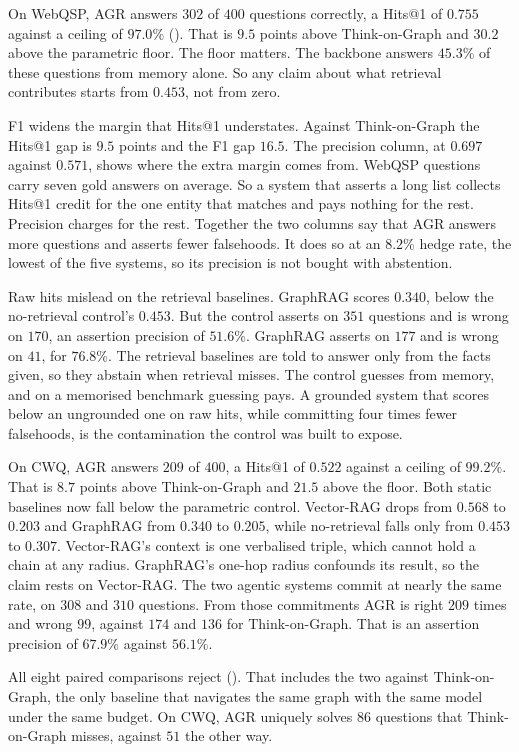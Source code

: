 On WebQSP, AGR answers $302$ of $400$ questions correctly, a Hits@1 of $0.755$
against a ceiling of $97.0\%$ (). That is $9.5$ points above
Think-on-Graph and $30.2$ above the parametric floor. The floor matters. The
backbone answers $45.3\%$ of these questions from memory alone. So any claim
about what retrieval contributes starts from $0.453$, not from zero.

F1 widens the margin that Hits@1 understates. Against Think-on-Graph the Hits@1
gap is $9.5$ points and the F1 gap $16.5$. The precision column, at $0.697$
against $0.571$, shows where the extra margin comes from. WebQSP questions carry
seven gold answers on average. So a system that asserts a long list collects
Hits@1 credit for the one entity that matches and pays nothing for the rest.
Precision charges for the rest. Together the two columns say that AGR answers
more questions and asserts fewer falsehoods. It does so at an $8.2\%$ hedge
rate, the lowest of the five systems, so its precision is not bought with
abstention.

Raw hits mislead on the retrieval baselines. GraphRAG scores $0.340$, below the
no-retrieval control's $0.453$. But the control asserts on $351$ questions and
is wrong on $170$, an assertion precision of $51.6\%$. GraphRAG asserts on $177$
and is wrong on $41$, for $76.8\%$. The retrieval baselines are told to answer
only from the facts given, so they abstain when retrieval misses. The control
guesses from memory, and on a memorised benchmark guessing pays. A grounded
system that scores below an ungrounded one on raw hits, while committing four
times fewer falsehoods, is the contamination the control was built to expose.

On CWQ, AGR answers $209$ of $400$, a Hits@1 of $0.522$ against a ceiling of
$99.2\%$. That is $8.7$ points above Think-on-Graph and $21.5$ above the floor.
Both static baselines now fall below the parametric control. Vector-RAG drops
from $0.568$ to $0.203$ and GraphRAG from $0.340$ to $0.205$, while no-retrieval
falls only from $0.453$ to $0.307$. Vector-RAG's context is one verbalised
triple, which cannot hold a chain at any radius. GraphRAG's one-hop radius
confounds its result, so the claim rests on Vector-RAG. The two agentic systems
commit at nearly the same rate, on $308$ and $310$ questions. From those
commitments AGR is right $209$ times and wrong $99$, against $174$ and $136$ for
Think-on-Graph. That is an assertion precision of $67.9\%$ against $56.1\%$.

All eight paired comparisons reject (). That includes the two
against Think-on-Graph, the only baseline that navigates the same graph with the
same model under the same budget. On CWQ, AGR uniquely solves $86$ questions
that Think-on-Graph misses, against $51$ the other way.

